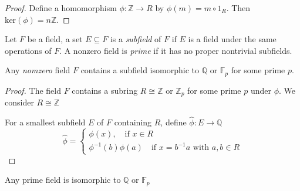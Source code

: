 \begin{proof}
Define a homomorphism $\phi:\mathbb{Z}\to R$ by $\phi(m)=m\circ 1_R$. Then $\mbox{ker}(\phi)=n\mathbb{Z}$.
\end{proof}
\begin{definition}
Let $F$ be a field, a set $E\subseteq F$ is a \emph{subfield} of $F$ if $E$ is a field under the same operations of $F$. A nonzero field is \emph{prime} if it has no proper nontrivial subfields.
\end{definition}
\begin{corollary}
Any \emph{nomzero} field $F$ contains a subfield isomorphic to $\mathbb{Q}$ or $\mathbb{F}_p$ for some prime $p$.
\end{corollary}
\begin{proof}
The field $F$ contains a subring $R\cong\mathbb{Z}$ or $\mathbb{Z}_p$ for some prime $p$ under $\phi$. We consider $R\cong\mathbb{Z}$

For a smallest subfield $E$ of $F$ containing $R$, define $\hat\phi:E\to\mathbb{Q}$
\[
\hat\phi=\left\{
\begin{aligned}
\phi(x),\quad\mbox{if $x\in R$}\\
\phi^{-1}(b)\phi(a)\quad\mbox{if $x=b^{-1}a$ with $a,b\in R$}
\end{aligned}
\right.
\]
\end{proof}
\begin{corollary}
Any prime field is isomorphic to $\mathbb{Q}$ or $\mathbb{F}_p$
\end{corollary}





















